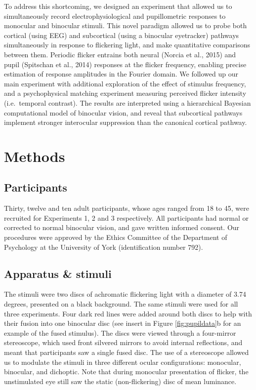 \documentclass[
]{article}
\begin{document}
To address this shortcoming, we designed an experiment that allowed us to simultaneously record electrophysiological and pupillometric responses to monocular and binocular stimuli. This novel paradigm allowed us to probe both cortical (using EEG) and subcortical (using a binocular eyetracker) pathways simultaneously in response to flickering light, and make quantitative comparisons between them. Periodic flicker entrains both neural (Norcia et al., 2015) and pupil (Spitschan et al., 2014) responses at the flicker frequency, enabling precise estimation of response amplitudes in the Fourier domain. We followed up our main experiment with additional exploration of the effect of stimulus frequency, and a psychophysical matching experiment measuring perceived flicker intensity (i.e.~temporal contrast). The results are interpreted using a hierarchical Bayesian computational model of binocular vision, and reveal that subcortical pathways implement stronger interocular suppression than the canonical cortical pathway.

\hypertarget{methods}{%
\section{Methods}\label{methods}}

\hypertarget{participants}{%
\subsection{Participants}\label{participants}}

Thirty, twelve and ten adult participants, whose ages ranged from 18 to 45, were recruited for Experiments 1, 2 and 3 respectively. All participants had normal or corrected to normal binocular vision, and gave written informed consent. Our procedures were approved by the Ethics Committee of the Department of Psychology at the University of York (identification number 792).

\hypertarget{apparatus-stimuli}{%
\subsection{Apparatus \& stimuli}\label{apparatus-stimuli}}

The stimuli were two discs of achromatic flickering light with a diameter of 3.74 degrees, presented on a black background. The same stimuli were used for all three experiments. Four dark red lines were added around both discs to help with their fusion into one binocular disc (see insert in Figure \ref{fig:pupildata}b for an example of the fused stimulus). The discs were viewed through a four-mirror stereoscope, which used front silvered mirrors to avoid internal reflections, and meant that participants saw a single fused disc. The use of a stereoscope allowed us to modulate the stimuli in three different ocular configurations: monocular, binocular, and dichoptic. Note that during monocular presentation of flicker, the unstimulated eye still saw the static (non-flickering) disc of mean luminance.
\end{document}
